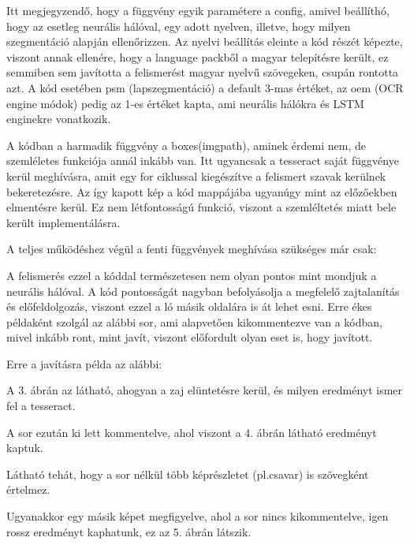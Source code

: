 \documentclass[hidelinks,12pt,a4paper]{report}
\begin{document}
Itt megjegyzendő, hogy a függvény egyik paramétere a config, amivel beállíthó, hogy az esetleg neurális hálóval, egy adott nyelven, illetve, hogy milyen szegmentáció alapján ellenőrizzen. Az nyelvi beállítás eleinte a kód részét képezte, viszont annak ellenére, hogy a language packből a magyar telepítésre került, ez semmiben sem javította a felismerést magyar nyelvű szövegeken, csupán rontotta azt. A kód esetében psm (lapszegmentáció) a default 3-mas értéket, az oem (OCR engine módok) pedig az 1-es értéket kapta, ami neurális hálókra és LSTM enginekre vonatkozik.

A kódban a harmadik függvény a boxes(imgpath), aminek érdemi nem, de szemléletes funkciója annál inkább van. Itt ugyancsak a tesseract saját függvénye kerül meghívásra, amit egy for ciklussal kiegészítve a felismert szavak kerülnek bekeretezésre.
Az így kapott kép a kód mappájába ugyanúgy mint az előzőekben elmentésre kerül. Ez nem létfontosságú funkció, viszont a szemléltetés miatt bele került implementálásra.


A teljes működéshez végül a fenti függvények meghívása szükséges már csak:




A felismerés ezzel a kóddal természetesen nem olyan pontos mint mondjuk a neurális hálóval. A kód pontosságát nagyban befolyásolja a megfelelő zajtalanítás és előfeldolgozás, viszont ezzel a ló másik oldalára is át lehet esni. 
Erre ékes példaként szolgál az alábbi sor, ami alapvetően kikommentezve van a kódban, mivel inkább ront, mint javít, viszont előfordult olyan eset is, hogy javított.


Erre a javításra példa az alábbi:


A 3. ábrán az látható, ahogyan a zaj elüntetésre kerül, és milyen eredményt ismer fel a tesseract.

A sor ezután ki lett kommentelve, ahol viszont a 4. ábrán látható eredményt kaptuk.


Látható tehát, hogy a sor nélkül több képrészletet (pl.csavar) is szövegként értelmez.

Ugyanakkor egy másik képet megfigyelve, ahol a sor nincs kikommentelve, igen rossz eredményt kaphatunk, ez az 5. ábrán látszik.
\end{document}
